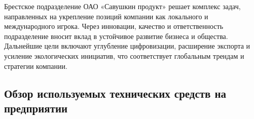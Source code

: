 {	\par \redline Брестское подразделение ОАО «Савушкин продукт» решает комплекс задач, направленных на укрепление позиций компании как локального и международного игрока. Через инновации, качество и ответственность подразделение вносит вклад в устойчивое развитие бизнеса и общества. Дальнейшие цели включают углубление цифровизации, расширение экспорта и усиление экологических инициатив, что соответствует глобальным трендам и стратегии компании.
	
	\par
}

\subtitlespace

\subsection*{
	\gostTitleFont
	 Обзор используемых технических средств на предприятии
} 

\subtitlespace

